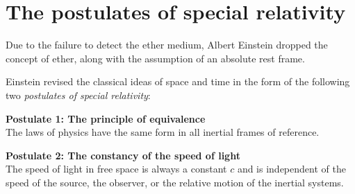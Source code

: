 \section{The postulates of special relativity}
	Due to the failure to detect the ether medium, Albert Einstein dropped the concept of ether, along with the assumption of an absolute rest frame.
	
	Einstein revised the classical ideas of space and time in the form of the following two \emph{postulates of special relativity}:
	
	\textbf{Postulate 1: The principle of equivalence}\\
	The laws of physics have the same form in all inertial frames of reference.
	
	\textbf{Postulate 2: The constancy of the speed of light}\\
	The speed of light in free space is always a constant $c$ and is independent of the speed of the source, the observer, or the relative motion of the inertial systems.